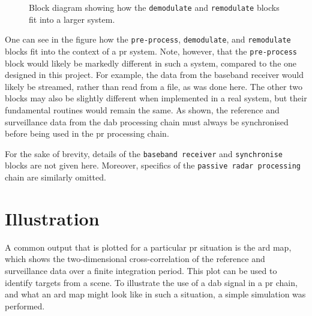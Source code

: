 \documentclass[class=report,11pt,crop=false]{standalone}
\begin{document}
\begin{figure}[htbp]
    \centering
    \captionsetup{type=figure}
    \def\svgwidth{\linewidth}
    { %
    \scriptsize
    }
    \caption{Block diagram showing how the \texttt{demodulate} and \texttt{remodulate} blocks fit into a larger  system.}
    \label{fig:BD_pr-integration}
\end{figure}

One can see in the figure how the \texttt{pre-process}, \texttt{demodulate}, and \texttt{remodulate} blocks fit into the context of a \gls{pr} system. Note, however, that the \texttt{pre-process} block would likely be markedly different in such a system, compared to the one designed in this project. For example, the data from the baseband receiver would likely be streamed, rather than read from a file, as was done here. The other two blocks may also be slightly different when implemented in a real system, but their fundamental routines would remain the same. As shown, the reference and surveillance data from the \gls{dab} processing chain must always be synchronised before being used in the \gls{pr} processing chain.

For the sake of brevity, details of the \texttt{baseband receiver} and \texttt{synchronise} blocks are not given here. Moreover, specifics of the \texttt{passive radar processing} chain are similarly omitted.

\section{Illustration}
A common output that is plotted for a particular \gls{pr} situation is the \gls{ard} map, which shows the two-dimensional cross-correlation of the reference and surveillance data over a finite integration period. This plot can be used to identify targets from a scene. To illustrate the use of a \gls{dab} signal in a \gls{pr} chain, and what an \gls{ard} map might look like in such a situation, a simple simulation was performed.
\end{document}
